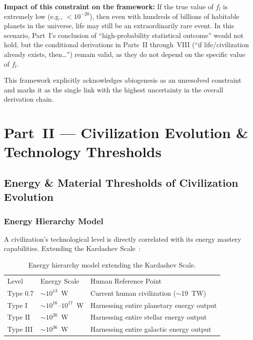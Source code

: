 \documentclass[aps,prd,twocolumn,superscriptaddress,nofootinbib]{revtex4-2}
\begin{document}
\textbf{Impact of this constraint on the framework:} If the true value of $f_l$ is extremely low (e.g., $<10^{-20}$), then even with hundreds of billions of habitable planets in the universe, life may still be an extraordinarily rare event. In this scenario, Part~I's conclusion of ``high-probability statistical outcome'' would not hold, but the conditional derivations in Parts~II through~VIII (``if life/civilization already exists, then\ldots'') remain valid, as they do not depend on the specific value of $f_l$.

This framework explicitly acknowledges abiogenesis as an unresolved constraint and marks it as the single link with the highest uncertainty in the overall derivation chain.


\section{Part~II --- Civilization Evolution \& Technology Thresholds}\label{sec:part2}

\subsection{Energy \& Material Thresholds of Civilization Evolution}\label{sec:energy-material}

\subsubsection{Energy Hierarchy Model}\label{sec:energy-hierarchy}

A civilization's technological level is directly correlated with its energy mastery capabilities. Extending the Kardashev Scale~\cite{Kardashev1964}:

\begin{table}[htbp]
\caption{Energy hierarchy model extending the Kardashev Scale.}
\label{tab:kardashev}
\begin{ruledtabular}
\begin{tabular}{lll}
Level & Energy Scale & Human Reference Point \\
\colrule
Type 0.7 & ${\sim}10^{13}$~W & Current human civilization (${\sim}$\SI{19}{TW}) \\
Type I & ${\sim}10^{16}$--$10^{17}$~W & Harnessing entire planetary energy output \\
Type II & ${\sim}10^{26}$~W & Harnessing entire stellar energy output \\
Type III & ${\sim}10^{36}$~W & Harnessing entire galactic energy output \\
\end{tabular}
\end{ruledtabular}
\end{table}
\end{document}
